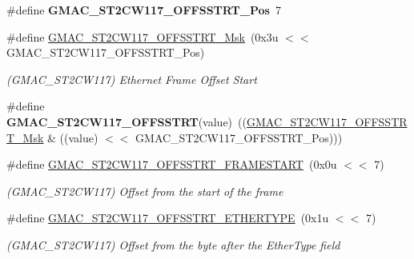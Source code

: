 \begin{DoxyCompactItemize}
\item 
\mbox{\label{group__SAMV71__GMAC_gace86b42d09355d09cf5b2c22f5cb1f0e}} 
\#define {\bfseries G\+M\+A\+C\+\_\+\+S\+T2\+C\+W117\+\_\+\+O\+F\+F\+S\+S\+T\+R\+T\+\_\+\+Pos}~7
\item 
\mbox{\label{group__SAMV71__GMAC_ga3b1c72ac70774588fb43447f588bddf0}} 
\#define \mbox{\hyperlink{group__SAMV71__GMAC_ga3b1c72ac70774588fb43447f588bddf0}{G\+M\+A\+C\+\_\+\+S\+T2\+C\+W117\+\_\+\+O\+F\+F\+S\+S\+T\+R\+T\+\_\+\+Msk}}~(0x3u $<$$<$ G\+M\+A\+C\+\_\+\+S\+T2\+C\+W117\+\_\+\+O\+F\+F\+S\+S\+T\+R\+T\+\_\+\+Pos)
\begin{DoxyCompactList}\small\item\em (G\+M\+A\+C\+\_\+\+S\+T2\+C\+W117) Ethernet Frame Offset Start \end{DoxyCompactList}\item 
\mbox{\label{group__SAMV71__GMAC_ga1406dcb0c21c79f10dbb635a2c6d5687}} 
\#define {\bfseries G\+M\+A\+C\+\_\+\+S\+T2\+C\+W117\+\_\+\+O\+F\+F\+S\+S\+T\+RT}(value)~((\mbox{\hyperlink{group__SAMV71__GMAC_ga3b1c72ac70774588fb43447f588bddf0}{G\+M\+A\+C\+\_\+\+S\+T2\+C\+W117\+\_\+\+O\+F\+F\+S\+S\+T\+R\+T\+\_\+\+Msk}} \& ((value) $<$$<$ G\+M\+A\+C\+\_\+\+S\+T2\+C\+W117\+\_\+\+O\+F\+F\+S\+S\+T\+R\+T\+\_\+\+Pos)))
\item 
\mbox{\label{group__SAMV71__GMAC_gad6b8b0c894711341bd39117f09da675e}} 
\#define \mbox{\hyperlink{group__SAMV71__GMAC_gad6b8b0c894711341bd39117f09da675e}{G\+M\+A\+C\+\_\+\+S\+T2\+C\+W117\+\_\+\+O\+F\+F\+S\+S\+T\+R\+T\+\_\+\+F\+R\+A\+M\+E\+S\+T\+A\+RT}}~(0x0u $<$$<$ 7)
\begin{DoxyCompactList}\small\item\em (G\+M\+A\+C\+\_\+\+S\+T2\+C\+W117) Offset from the start of the frame \end{DoxyCompactList}\item 
\mbox{\label{group__SAMV71__GMAC_ga32eb01278d551dedcd8d863ff872f166}} 
\#define \mbox{\hyperlink{group__SAMV71__GMAC_ga32eb01278d551dedcd8d863ff872f166}{G\+M\+A\+C\+\_\+\+S\+T2\+C\+W117\+\_\+\+O\+F\+F\+S\+S\+T\+R\+T\+\_\+\+E\+T\+H\+E\+R\+T\+Y\+PE}}~(0x1u $<$$<$ 7)
\begin{DoxyCompactList}\small\item\em (G\+M\+A\+C\+\_\+\+S\+T2\+C\+W117) Offset from the byte after the Ether\+Type field \end{DoxyCompactList}\item 

\end{DoxyCompactItemize}
